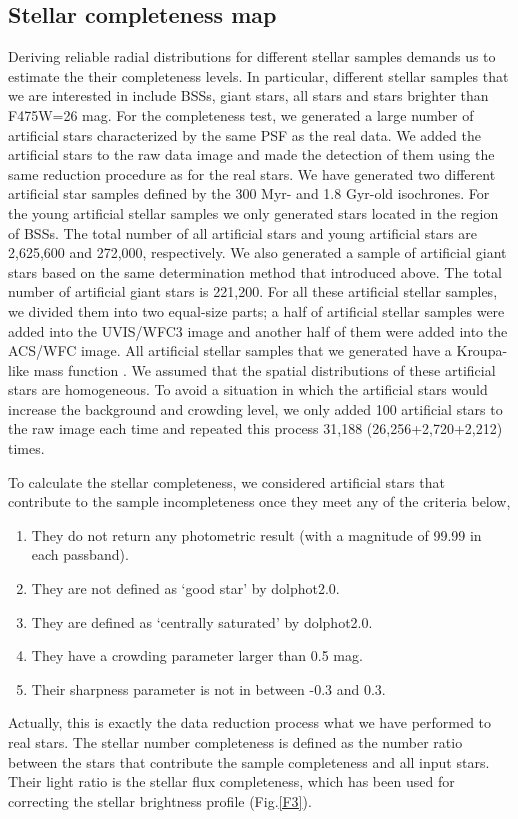 \documentclass[useAMS,usenatbib,twocolumn]{mnras}
\begin{document}
\subsection{Stellar completeness map}
Deriving reliable radial distributions for different stellar samples demands us to estimate the their completeness levels. In particular, different stellar samples that we are interested in include BSSs, giant stars, all stars and stars brighter than F475W=26 mag. For the completeness test, we generated a large number of artificial stars characterized by the same PSF as the real data. We added the artificial stars to the raw data image and made the detection of them using the same reduction procedure as for the real stars. We have generated two different artificial star samples defined by the 300 Myr- and 1.8 Gyr-old isochrones. For the young artificial stellar samples we only generated stars located in the region of BSSs. The total number of all artificial stars and young artificial stars are 2,625,600 and 272,000, respectively. We also generated a sample of artificial giant stars based on the same determination method that introduced above. The total number of artificial giant stars is 221,200. For all these artificial stellar samples, we divided them into two equal-size parts; a half of artificial stellar samples were added into the UVIS/WFC3 image and another half of them were added into the ACS/WFC image. All artificial stellar samples that we generated have a Kroupa-like mass function \citep{Krou01a}. We assumed that the spatial distributions of these artificial stars are homogeneous. To avoid a situation in which the artificial stars would increase the background and crowding level, we only added 100 artificial stars to the raw image each time and repeated this process 31,188 (26,256+2,720+2,212) times. 

To calculate the stellar completeness, we considered artificial stars that contribute to the sample incompleteness once they meet any of the criteria below,
\begin{enumerate}
\item They do not return any photometric result (with a magnitude of 99.99 in each passband).
\item They are not defined as `good star' by {\sc dolphot2.0}.
\item They are defined as `centrally saturated' by {\sc dolphot2.0}.
\item They have a crowding parameter larger than 0.5 mag.
\item Their sharpness parameter is not in between -0.3 and 0.3.
\end{enumerate}
Actually, this is exactly the data reduction process what we have performed to real stars. The stellar number completeness is defined as the number ratio between the stars that contribute the sample completeness and all input stars. Their light ratio is the stellar flux completeness, which has been used for correcting the stellar brightness profile (Fig.\ref{F3}).
\end{document}

